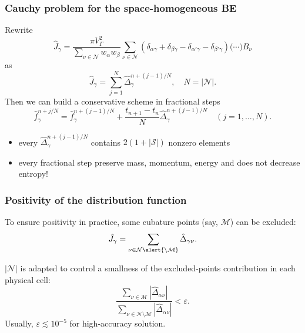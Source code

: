 \documentclass[mathserif]{beamer} %
\newcommand{\Nu}{\mathcal{N}}
\begin{document}
\begin{frame}
    \frametitle{Cauchy problem for the space-homogeneous BE}
    Rewrite
    \begin{equation}
        \hat{J}_\gamma = \frac{\pi V_\Gamma^2}{\sum_{\nu\in\Nu} w_{\alpha}w_{\beta}}
        \sum_{\nu\in\Nu} \left(
            \delta_{\alpha\gamma} + \delta_{\beta\gamma} -
            \delta_{\alpha'\gamma} - \delta_{\beta'\gamma}
        \right)\big(\cdots\big)B_\nu
    \end{equation}
    as
    \begin{equation}
        \hat{J}_{\gamma} = \sum_{j=1}^N \hat{\Delta}_{\gamma}^{n+(j-1)/N}, \quad N=|\Nu|.
    \end{equation}
    Then we can build a conservative scheme in fractional steps
    \begin{equation}\label{eq:fractional_step_scheme}
        \hat{f}_\gamma^{n+j/N} = \hat{f}_\gamma^{n+(j-1)/N} + \frac{t_{n+1}-t_n}{N}\hat{\Delta}_{\gamma}^{n+(j-1)/N}
        \quad (j = 1,\dotsc,N).
    \end{equation}
    \pause
    \begin{itemize}
        \item every \(\hat{\Delta}_{\gamma}^{n+(j-1)/N}\) contains \(2(1+|\mathcal{S}|)\) nonzero elements
        \item every fractional step preserve mass, momentum, energy and does not decrease entropy!
    \end{itemize}
\end{frame}

\begin{frame}
    \frametitle{Positivity of the distribution function}
    To ensure positivity in practice, some cubature points (say, \(\mathcal{M}\)) can be excluded:
    \begin{equation}\label{eq:discrete_short_ci_discarded}
        \hat{J}_\gamma = \sum_{\nu\in\Nu\alert{\setminus\mathcal{M}}} \hat{\Delta}_{\gamma\nu}.
    \end{equation}
    \vspace{10pt}

    \(|\Nu|\) is adapted to control a smallness of the excluded-points contribution in each physical cell:
    \begin{equation}\label{eq:excluded_contribution}
        \frac{\sum_{\nu\in\mathcal{M}} \left| \hat{\Delta}_{\alpha\nu} \right|}
            {\sum_{\nu\in\Nu\setminus\mathcal{M}} \left| \hat{\Delta}_{\alpha\nu} \right|} < \varepsilon.
    \end{equation}
    Usually, \(\varepsilon \lesssim 10^{-5}\) for high-accuracy solution.
\end{frame}
\end{document}
